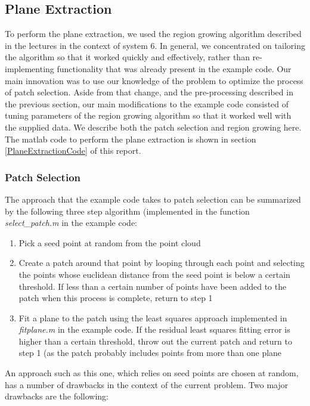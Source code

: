 \subsection{Plane Extraction}

To perform the plane extraction, we used the region growing algorithm described in the lectures in the context of system 6. In general, we concentrated on tailoring the algorithm so that it worked quickly and effectively, rather than re-implementing functionality that was already present in the example code. Our main innovation was to use our knowledge of the problem to optimize the process of patch selection. Aside from that change, and the pre-processing described in the previous section, our main modifications to the example code consisted of tuning parameters of the region growing algorithm so that it worked well with the supplied data. We describe both the patch selection and region growing here. The matlab code to perform the plane extraction is shown in section \ref{PlaneExtractionCode} of this report.

\subsubsection{Patch Selection}

The approach that the example code takes to patch selection can be summarized by the following three step algorithm (implemented in the function \emph{select\_patch.m} in the example code:

\begin{enumerate}
	\item Pick a seed point at random from the point cloud
	\item Create a patch around that point by looping through each point and selecting the points whose euclidean distance from the seed point is below a certain threshold. If less than a certain number of points have been added to the patch when this process is complete, return to step 1
	\item Fit a plane to the patch using the least squares approach implemented in \emph{fitplane.m} in the example code. If the residual least squares fitting error is higher than a certain threshold, throw out the current patch and return to step 1 (as the patch probably includes points from more than one plane
\end{enumerate}

An approach such as this one, which relies on seed points are chosen at random, has a number of drawbacks in the context of the current problem. Two major drawbacks are the following:

